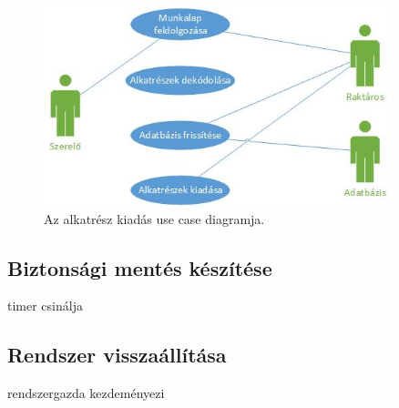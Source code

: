 \documentclass[11pt]{article}\usepackage[left=20mm,right=20mm,top=15mm,bottom=20mm]{geometry}
\begin{document}
\begin{figure}[!h]
    \centering
        \includegraphics[width=0.9\textwidth]{figures/alkatresz_kiadas_UC.jpg}
        \caption{Az alkatrész kiadás use case diagramja.}
\end{figure}

\subsection{Biztonsági mentés készítése}
timer csinálja

\subsection{Rendszer visszaállítása}
rendszergazda kezdeményezi





\FloatBarrier
\end{document}
